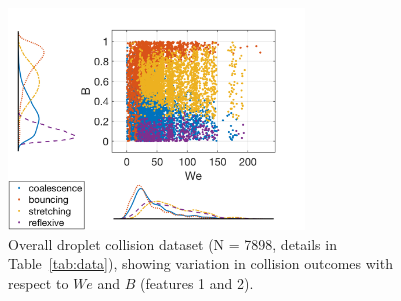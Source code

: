 \documentclass{article}
\begin{document}
\begin{figure}[h]
	\centering
	\includegraphics[width=0.7\textwidth]{../figures/data_scatterhist.png}
	\caption{Overall droplet collision dataset (N = 7898, details in Table~\ref{tab:data}), showing variation in collision outcomes with respect to $We$ and $B$ (features 1 and 2).}
	\label{fig:data0}
\end{figure}
\end{document}
